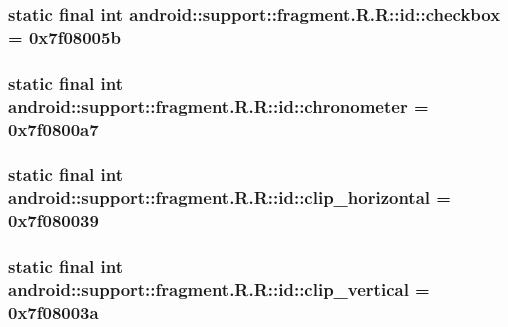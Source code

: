 \hypertarget{classandroid_1_1support_1_1fragment_1_1_r_1_1id_7ef12256e7ea2fd459b6af5ac682335a}{
\subsubsection[{checkbox}]{\setlength{\rightskip}{0pt plus 5cm}static final int android::support::fragment.R.R::id::checkbox = 0x7f08005b}}
\label{classandroid_1_1support_1_1fragment_1_1_r_1_1id_7ef12256e7ea2fd459b6af5ac682335a}


\hypertarget{classandroid_1_1support_1_1fragment_1_1_r_1_1id_a93ca5d26dc4865a2b0c39312297c3ad}{
\subsubsection[{chronometer}]{\setlength{\rightskip}{0pt plus 5cm}static final int android::support::fragment.R.R::id::chronometer = 0x7f0800a7}}
\label{classandroid_1_1support_1_1fragment_1_1_r_1_1id_a93ca5d26dc4865a2b0c39312297c3ad}


\hypertarget{classandroid_1_1support_1_1fragment_1_1_r_1_1id_1825c656cdcb8f1cc0127555b2299af5}{
\subsubsection[{clip\_\-horizontal}]{\setlength{\rightskip}{0pt plus 5cm}static final int android::support::fragment.R.R::id::clip\_\-horizontal = 0x7f080039}}
\label{classandroid_1_1support_1_1fragment_1_1_r_1_1id_1825c656cdcb8f1cc0127555b2299af5}


\hypertarget{classandroid_1_1support_1_1fragment_1_1_r_1_1id_6dbdce3f10d2fcd529a14925cd9fccb3}{
\subsubsection[{clip\_\-vertical}]{\setlength{\rightskip}{0pt plus 5cm}static final int android::support::fragment.R.R::id::clip\_\-vertical = 0x7f08003a}}
\label{classandroid_1_1support_1_1fragment_1_1_r_1_1id_6dbdce3f10d2fcd529a14925cd9fccb3}


